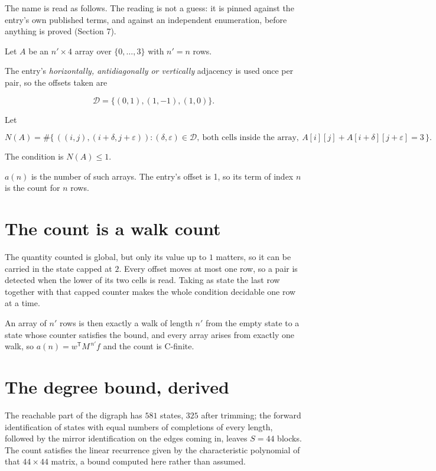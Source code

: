 \documentclass[11pt]{article}
\theoremstyle{definition}
\begin{document}
The name is read as follows. The reading is not a guess: it is pinned against the entry's own published terms, and against an independent enumeration, before anything is proved (Section 7).

Let $A$ be an $n' \times 4$ array over $\{0,\dots,3\}$ with $n' = n$ rows.

The entry's {\itshape horizontally, antidiagonally or vertically} adjacency is used once per pair, so the offsets taken are

\[\mathcal{D} = \{(0,1), (1,-1), (1,0)\}.\]

Let

\[N(A) = \#\bigl\{\,((i,j),(i{+}\delta,j{+}\varepsilon)) : (\delta,\varepsilon) \in \mathcal{D},\ \text{both cells inside the array},\ A[i][j] + A[i{+}\delta][j{+}\varepsilon] = 3\,\bigr\}.\]

The condition is $N(A) \le 1$.

$a(n)$ is the number of such arrays. The entry's offset is 1, so its term of index $n$ is the count for $n$ rows.

\section{The count is a walk count}

The quantity counted is global, but only its value up to $1$ matters, so it can be carried in the state capped at $2$. Every offset moves at most one row, so a pair is detected when the lower of its two cells is read. Taking as state the last row together with that capped counter makes the whole condition decidable one row at a time.

An array of $n'$ rows is then exactly a walk of length $n'$ from the empty state to a state whose counter satisfies the bound, and every array arises from exactly one walk, so $a(n) = w^{\mathsf T}M^{\,n'}f$ and the count is C-finite.

\section{The degree bound, derived}

The reachable part of the digraph has $581$ states, $325$ after trimming; the forward identification of states with equal numbers of completions of every length, followed by the mirror identification on the edges coming in, leaves $S = 44$ blocks. The count satisfies the linear recurrence given by the characteristic polynomial of that $44\times44$ matrix, a bound computed here rather than assumed.
\end{document}
